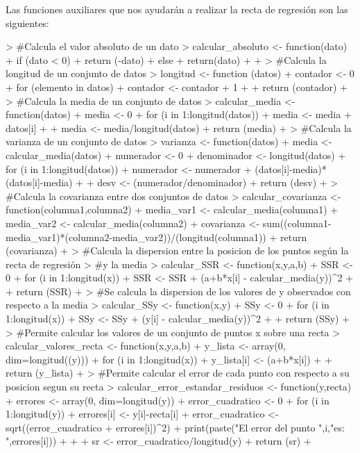 \documentclass[parskip=full]{scrartcl}
\begin{document}
Las funciones auxiliares que nos ayudarán a realizar la recta de regresión son las siguientes:


\begin{Schunk}
\begin{Sinput}
> #Calcula el valor absoluto de un dato
> calcular_absoluto <- function(dato){
+   if (dato < 0){
+     return (-dato)
+   }else{
+     return(dato)
+   }
+ }
> #Calcula la longitud de un conjunto de datos
> longitud <- function (datos){
+   contador <- 0
+   for (elemento in datos){
+     contador <- contador + 1
+   }
+   return (contador)
+ }
> #Calcula la media de un conjunto de datos
> calcular_media <- function(datos){
+   media <- 0
+   for (i in 1:longitud(datos)){
+     media <- media + datos[i]
+   }
+   media <- media/longitud(datos)
+   return (media)
+ }
> #Calcula la varianza de un conjunto de datos
> varianza <- function(datos){
+   media <- calcular_media(datos)
+   numerador <- 0
+   denominador <- longitud(datos)
+   for (i in 1:longitud(datos)){
+     numerador <- numerador + (datos[i]-media)*(datos[i]-media)
+   }
+   desv <- (numerador/denominador)
+   return (desv)
+ }
> #Calcula la covarianza entre dos conjuntos de datos
> calcular_covarianza <- function(columna1,columna2){
+   media_var1 <- calcular_media(columna1)
+   media_var2 <- calcular_media(columna2)
+   covarianza <- sum((columna1-media_var1)*(columna2-media_var2))/(longitud(columna1))
+   return (covarianza)
+ }
> #Calcula la dispersion entre la posicion de los puntos según la recta de regresión 
> #y la media
> calcular_SSR <- function(x,y,a,b){
+   SSR <- 0
+   for (i in 1:longitud(x)){
+     SSR <- SSR + (a+b*x[i] - calcular_media(y))^2
+   }
+   return (SSR)
+ }
> #Se calcula la dispersion de los valores de y observados con respecto a la media
> calcular_SSy <- function(x,y){
+   SSy <- 0
+   for (i in 1:longitud(x)){
+     SSy <- SSy + (y[i] - calcular_media(y))^2
+   }
+   return (SSy)
+ }
> #Permite calcular los valores de un conjunto de puntos x sobre una recta 
> calcular_valores_recta <- function(x,y,a,b){
+   y_lista <- array(0, dim=longitud((y)))
+   for (i in 1:longitud(x)){
+     y_lista[i] <- (a+b*x[i])
+   }
+   return (y_lista)
+ }
> #Permite calcular el error de cada punto con respecto a su posicion segun su recta 
> calcular_error_estandar_residuos <- function(y,recta){
+   errores <- array(0, dim=longitud(y))
+   error_cuadratico <- 0
+   for (i in 1:longitud(y)){
+     errores[i] <- y[i]-recta[i]
+     error_cuadratico <- sqrt((error_cuadratico + errores[i])^2)
+     print(paste("El error del punto ",i,"es: ",errores[i]))
+     
+   }
+   sr <- error_cuadratico/longitud(y)
+   return (sr)
+ }
\end{Sinput}
\end{Schunk}
\end{document}
